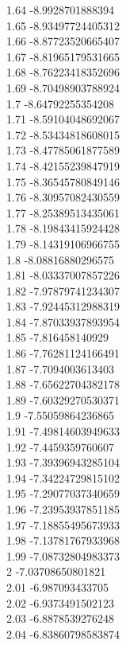 {1.64	-8.9928701888394\\
1.65	-8.93497724405312\\
1.66	-8.87723520665407\\
1.67	-8.81965179531665\\
1.68	-8.76223418352696\\
1.69	-8.70498903788924\\
1.7	-8.64792255354208\\
1.71	-8.59104048692067\\
1.72	-8.53434818608015\\
1.73	-8.47785061877589\\
1.74	-8.42155239847919\\
1.75	-8.36545780849146\\
1.76	-8.30957082430559\\
1.77	-8.25389513435061\\
1.78	-8.19843415924428\\
1.79	-8.14319106966755\\
1.8	-8.08816880296575\\
1.81	-8.03337007857226\\
1.82	-7.97879741234307\\
1.83	-7.92445312988319\\
1.84	-7.87033937893954\\
1.85	-7.816458140929\\
1.86	-7.76281124166491\\
1.87	-7.7094003613403\\
1.88	-7.65622704382178\\
1.89	-7.60329270530371\\
1.9	-7.55059864236865\\
1.91	-7.49814603949633\\
1.92	-7.4459359760607\\
1.93	-7.39396943285104\\
1.94	-7.34224729815102\\
1.95	-7.29077037340659\\
1.96	-7.23953937851185\\
1.97	-7.18855495673933\\
1.98	-7.13781767933968\\
1.99	-7.08732804983373\\
2	-7.03708650801821\\
2.01	-6.987093433705\\
2.02	-6.9373491502123\\
2.03	-6.8878539276248\\
2.04	-6.83860798583874\\
}
